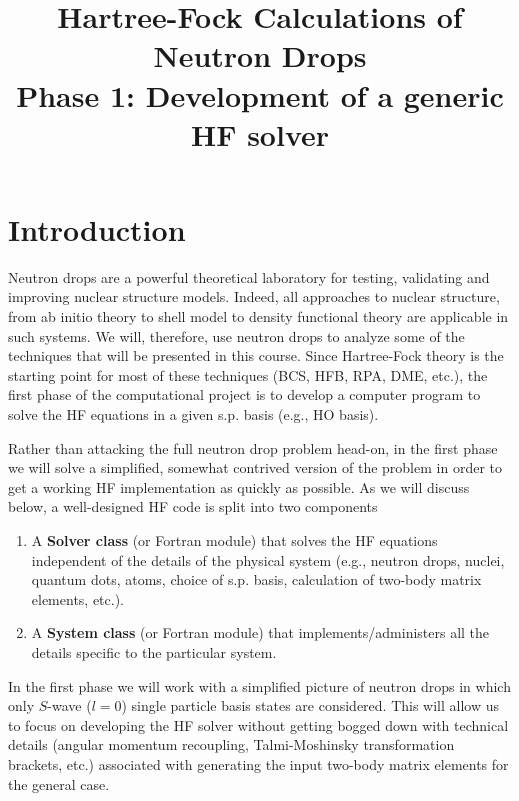 \documentclass[letterpaper,12pt]{article}
\begin{document}
\title{Hartree-Fock Calculations of Neutron Drops\\
\Large{Phase 1: Development of a generic HF solver
}}
\maketitle


\section{Introduction}

Neutron drops are a powerful theoretical laboratory for testing, validating and improving nuclear structure models. Indeed, all approaches to nuclear structure, from ab initio theory to shell model to density functional theory are applicable in such systems. We  will, therefore, use neutron drops to analyze some of the techniques that will be presented in this course. Since Hartree-Fock theory is the starting point for most of these techniques (BCS, HFB, RPA, DME, etc.), the first phase of the computational project is to develop a computer program to solve the HF equations in a given s.p. basis (e.g., HO basis). 

Rather than attacking the full neutron drop problem head-on, in the first phase we will solve a simplified, somewhat contrived version of the problem in order to get a working HF implementation as quickly as possible.   As we will discuss below, a well-designed HF code is split into two components
\begin{enumerate}
\item A {\bf Solver class} (or Fortran module) that solves the HF equations independent of the details of the physical system (e.g., neutron drops, nuclei, quantum dots, atoms, choice of s.p. basis, calculation of two-body matrix elements, etc.). 
\item A {\bf System class} (or Fortran module) that implements/administers all the details specific to the particular system.  
\end{enumerate} 

In the first phase we will work with a simplified picture of neutron drops in which only $S$-wave ($l=0$) single particle basis states are considered. This will allow us to focus on developing the HF solver without getting bogged down with technical details (angular momentum recoupling, Talmi-Moshinsky transformation brackets, etc.) associated with generating the input two-body matrix elements for the general case.  
\end{document}
